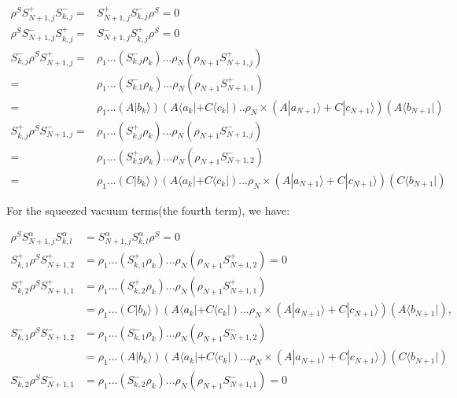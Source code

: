 \documentclass[aps,showpacs,twocolumn,twoside,groupedaddress]{revtex4}
\begin{document}
\begin{widetext}
\begin{equation}
\label{eq8}
\begin{split}
\rho^{S}S_{N+1,j}^{+}S_{k,j}^{-}=&S_{N+1,j}^{+}S_{k,j}^{-}\rho^{S}=0\\
\rho^{S}S_{N+1,j}^{-}S_{k,j}^{+}=&S_{N+1,j}^{-}S_{k,j}^{+}\rho^{S}=0\\
S_{k,j}^{-}\rho^{S}S_{N+1,j}^{+}=&\rho_{1}...(S_{k.j}^{-}\rho_{k})...\rho_{N}(\rho_{N+1}S_{N+1,j}^{+})\\
=&\rho_{1}...(S_{k.1}^{-}\rho_{k})...\rho_{N}(\rho_{N+1}S_{N+1,1}^{+})\\
=&\rho_{1}...(A|b_{k}\rangle)(A\langle a_{k}|+C\langle c_{k}|)..\rho_{N}\times(A|a_{N+1}\rangle+C|c_{N+1}\rangle)(A\langle b_{N+1}|)\\
S_{k,j}^{+}\rho^{S}S_{N+1,j}^{-}=&\rho_{1}...(S_{k.j}^{+}\rho_{k})...\rho_{N}(\rho_{N+1}S_{N+1,j}^{-})\\
=&\rho_{1}...(S_{k.2}^{+}\rho_{k})...\rho_{N}(\rho_{N+1}S_{N+1,2}^{-})\\
=&\rho_{1}...(C|b_{k}\rangle)(A\langle a_{k}|+C\langle c_{k}|)...\rho_{N}\times (A|a_{N+1}\rangle+C|c_{N+1}\rangle)(C\langle b_{N+1}|)
\end{split}
\end{equation}
\end{widetext}
For the squeezed vacuum terms(the fourth term), we have:
\begin{widetext}
\begin{equation}
\label{eq9}
\begin{split}
\rho^{S}S_{N+1,j}^{\alpha}S_{k,l}^{\alpha}&=S_{N+1,j}^{\alpha}S_{k,l}^{\alpha}\rho^{S}=0\\
S_{k,1}^{+}\rho^{S}S_{N+1,2}^{+}&=\rho_{1}...(S_{k,1}^{+}\rho_{k})...\rho_{N}(\rho_{N+1}S_{N+1,2}^{+})=0\\
S_{k,2}^{+}\rho^{S}S_{N+1,1}^{+}&=\rho_{1}...(S_{k,2}^{+}\rho_{k})...\rho_{N}(\rho_{N+1}S_{N+1,1}^{+})\\
&=\rho_{1}...(C|b_{k}\rangle)(A\langle a_{k}|+C\langle c_{k}|)...\rho_{N}\times(A|a_{N+1}\rangle+C|c_{N+1}\rangle)(A\langle b_{N+1}|),\\
S_{k,1}^{-}\rho^{S}S_{N+1,2}^{-}&=\rho_{1}...(S_{k,1}^{-}\rho_{k})...\rho_{N}(\rho_{N+1}S_{N+1,2}^{-})\\
&=\rho_{1}...(A|b_{k}\rangle)(A\langle a_{k}|+C\langle c_{k}|)...\rho_{N}\times(A|a_{N+1}\rangle+C|c_{N+1}\rangle)(C\langle b_{N+1}|)\\
S_{k,2}^{-}\rho^{S}S_{N+1,1}^{-}&=\rho_{1}...(S_{k,2}^{-}\rho_{k})...\rho_{N}(\rho_{N+1}S_{N+1,1}^{-})=0\\
\end{split}
\end{equation}
\end{widetext}
\end{document}
